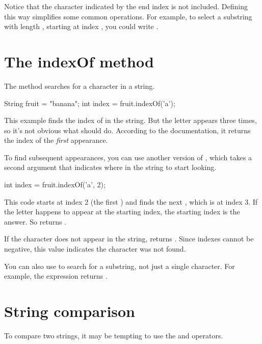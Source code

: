 Notice that the character indicated by the end index is not included.
Defining  this way simplifies some common operations.
For example, to select a substring with length , starting at index , you could write .


\section{The indexOf method}


The  method searches for a character in a string.

\begin{code}
String fruit = "banana";
int index = fruit.indexOf('a');
\end{code}

This example finds the index of  in the string.
But the letter appears three times, so it's not obvious what  should do.
According to the documentation, it returns the index of the {\em first} appearance.

To find subsequent appearances, you can use another version of , which takes a second argument that indicates where in the string to start looking.

\begin{code}
int index = fruit.indexOf('a', 2);
\end{code}

This code starts at index 2 (the first ) and finds the next , which is at index 3.
If the letter happens to appear at the starting index, the starting index is the answer.
So  returns .

If the character does not appear in the string,  returns .
Since indexes cannot be negative, this value indicates the character was not found.

You can also use  to search for a substring, not just a single character.
For example, the expression  returns .


\section{String comparison}
\label{strcmp}


To compare two strings, it may be tempting to use the \java{==} and \java{!=} operators.

